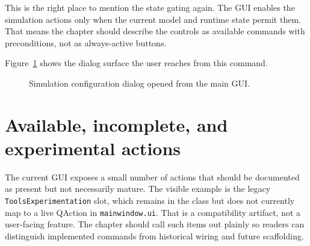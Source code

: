 This is the right place to mention the state gating again. The GUI enables the
simulation actions only when the current model and runtime state permit them.
That means the chapter should describe the controls as available commands with
preconditions, not as always-active buttons.

Figure~\ref{fig:main-graphical-simulation-config} shows the dialog surface the
user reaches from this command.

\begin{figure}[htbp]
\centering
{}
\caption{Simulation configuration dialog opened from the main GUI.}
\label{fig:main-graphical-simulation-config}
\end{figure}

\section{Available, incomplete, and experimental actions}
\label{sec:main-graphical-application-actions}

The current GUI exposes a small number of actions that should be documented as
present but not necessarily mature. The visible example is the legacy
\texttt{ToolsExperimentation} slot, which remains in the class but does not
currently map to a live QAction in \texttt{mainwindow.ui}. That is a
compatibility artifact, not a user-facing feature. The chapter should call
such items out plainly so readers can distinguish implemented commands from
historical wiring and future scaffolding.

